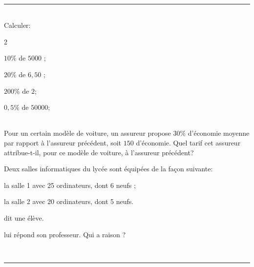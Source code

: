 \documentclass[a4paper,10pt]{book}        %
\begin{document}
\ \\
\mbox{}\hfill\rule{0.8\linewidth}{1pt}\hfill\mbox{}

\begin{minipage}[c]{0.58\linewidth}
\\
Calculer:
\begin{multicols}{2}
	\begin{enumMet}
		\item $10 \%$ de $5 000$ ;
		\item $20 \%$ de $6,50$ ;
		\item $200 \%$ de $2$;
		\item $0,5 \%$ de $50 000$;
	\end{enumMet}
\end{multicols}	

 \\
Pour un certain modèle de voiture, un assureur propose $30\%$
d'économie moyenne par rapport à l'assureur précédent, soit
$150$ \EUR{} d'économie. Quel tarif cet assureur attribue-t-il, pour
ce modèle de voiture, à l'assureur précédent?
\end{minipage} \hfill
\begin{minipage}[c]{0.38\linewidth}

Deux salles informatiques du lycée sont équipées de la façon suivante:

\begin{itemMet}
	\item la salle 1 avec 25 ordinateurs, dont 6 neufs ;
	\item la salle 2 avec 20 ordinateurs, dont 5 neufs.
\end{itemMet}
	 dit une élève.
	
	 lui répond son professeur. Qui a raison ?
\end{minipage}


\ \\
\mbox{}\hfill\rule{0.8\linewidth}{1pt}\hfill\mbox{}
\end{document}
